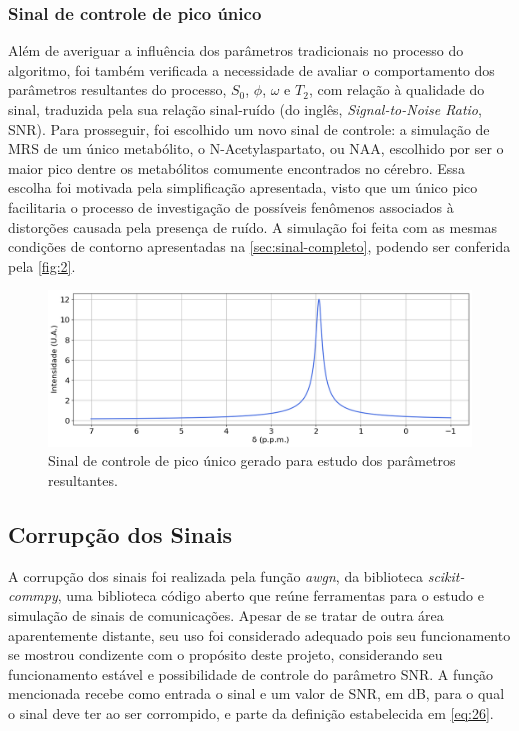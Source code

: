 \documentclass[12pt]{article}
\begin{document}
\subsubsection{Sinal de controle de pico único} \label{sec:sinal-unico}

Além de averiguar a influência dos parâmetros tradicionais no processo do algoritmo, foi também verificada a necessidade de avaliar o 
comportamento dos parâmetros resultantes do processo, $S_0$, $\phi$, $\omega$ e $T_2$, com relação à qualidade do sinal, traduzida pela
sua relação sinal-ruído (do inglês, \textit{Signal-to-Noise Ratio}, SNR). Para prosseguir, foi escolhido um novo sinal de controle: a 
simulação de MRS de um único metabólito, o N-Acetylaspartato, ou NAA, escolhido por ser o maior pico dentre os metabólitos comumente 
encontrados no cérebro. Essa escolha foi motivada pela simplificação apresentada, visto que um único pico facilitaria o processo de 
investigação de possíveis fenômenos associados à distorções causada pela presença de ruído. A simulação foi feita com as mesmas 
condições de contorno apresentadas na \autoref{sec:sinal-completo}, podendo ser conferida pela \autoref{fig:2}.

\begin{figure} [H]
    \includegraphics[scale=0.5]{sinal-unico-pico.png}
    \centering
    \caption{Sinal de controle de pico único gerado para estudo dos parâmetros resultantes.}
    \label{fig:2}
\end{figure}

\subsection{Corrupção dos Sinais}


A corrupção dos sinais foi realizada pela função \textit{awgn}, da biblioteca \textit{scikit-commpy}, uma biblioteca código aberto que 
reúne ferramentas para o estudo e simulação de sinais de comunicações. Apesar de se tratar de outra área aparentemente distante, seu uso 
foi considerado adequado pois seu funcionamento se mostrou condizente com o propósito deste projeto, considerando seu funcionamento 
estável e possibilidade de controle do parâmetro SNR. A função mencionada recebe como entrada o sinal e um valor de SNR, em dB, para o 
qual o sinal deve ter ao ser corrompido, e parte da definição estabelecida em \autoref{eq:26}.
\end{document}
